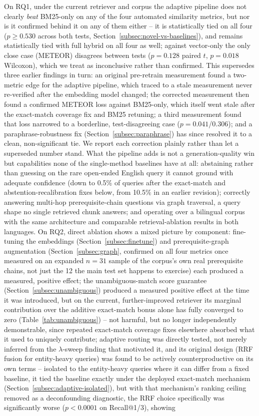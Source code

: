 \documentclass[a4paper,twoside]{article}
\begin{document}
On RQ1, under the current retriever and corpus the adaptive pipeline does not clearly \emph{beat} BM25-only on any of the four automated similarity metrics, but nor is it confirmed behind it on any of them either -- it is statistically tied on all four ($p\geq0.530$ across both tests, Section~\ref{subsec:novel-vs-baselines}), and remains statistically tied with full hybrid on all four as well; against vector-only the only close case (METEOR) disagrees between tests ($p=0.128$ paired $t$, $p=0.018$ Wilcoxon), which we treat as inconclusive rather than confirmed. This supersedes three earlier findings in turn: an original pre-retrain measurement found a two-metric edge for the adaptive pipeline, which traced to a stale measurement never re-verified after the embedding model changed; the corrected measurement then found a confirmed METEOR loss against BM25-only, which itself went stale after the exact-match coverage fix and BM25 retuning; a third measurement found that loss narrowed to a borderline, test-disagreeing case ($p=0.041$/$0.306$); and a paraphrase-robustness fix (Section~\ref{subsec:paraphrase}) has since resolved it to a clean, non-significant tie. We report each correction plainly rather than let a superseded number stand. What the pipeline adds is not a generation-quality win but capabilities none of the single-method baselines have at all: abstaining rather than guessing on the rare open-ended English query it cannot ground with adequate confidence (down to 0.5\% of queries after the exact-match and abstention-recalibration fixes below, from 10.5\% in an earlier revision); correctly answering multi-hop prerequisite-chain questions via graph traversal, a query shape no single retrieved chunk answers; and operating over a bilingual corpus with the same architecture and comparable retrieval-ablation results in both languages. On RQ2, direct ablation shows a mixed picture by component: fine-tuning the embeddings (Section~\ref{subsec:finetune}) and prerequisite-graph augmentation (Section~\ref{subsec:graph}, confirmed on all four metrics once measured on an expanded $n=31$ sample of the corpus's own real prerequisite chains, not just the 12 the main test set happens to exercise) each produced a measured, positive effect; the unambiguous-match score guarantee (Section~\ref{subsec:unambiguous}) produced a measured positive effect at the time it was introduced, but on the current, further-improved retriever its marginal contribution over the additive exact-match bonus alone has fully converged to zero (Table~\ref{tab:unambiguous}) -- not harmful, but no longer independently demonstrable, since repeated exact-match coverage fixes elsewhere absorbed what it used to uniquely contribute; adaptive routing was directly tested, not merely inferred from the $\lambda$-sweep finding that motivated it, and its original design (RRF fusion for entity-heavy queries) was found to be actively counterproductive on its own terms -- isolated to the entity-heavy queries where it can differ from a fixed baseline, it tied the baseline exactly under the deployed exact-match mechanism (Section~\ref{subsec:adaptive-isolated}), but with that mechanism's ranking ceiling removed as a deconfounding diagnostic, the RRF choice specifically was significantly worse ($p<0.0001$ on Recall@1/3), showing 
\end{document}
